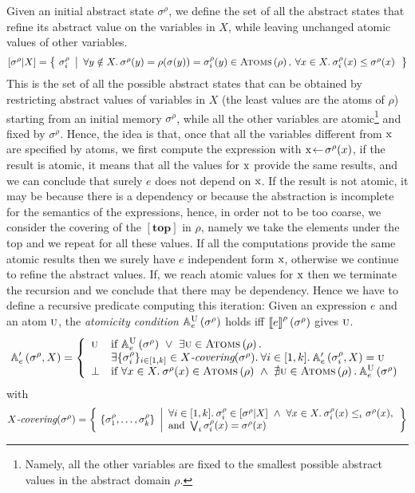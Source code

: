 \documentclass[prodmode,acmtocl]{acmsmall}
\def\state{\ensuremath{\sigma}\xspace}
\newcommand{\BIND}[2]{#1\!\leftarrow\!#2}
\def\uco{\ensuremath{\rho}\xspace}
\def\avaluee{\ensuremath{\mbox{{\sc{u}}}}\xspace}
\def\astate{{\sigma^\rho}\xspace}
\newcommand{\astatei}[1]{{\sigma^\rho_{#1}}\xspace}
\def\ok#1{\mbox{\raisebox{0ex}[1ex][1ex]{$#1$}}}
\newcommand{\sset}[2]{\left\{~#1 ~ \left |
                               \begin{array}{l}#2\end{array}
                          \right.     \right\}}
\newcommand{\0}{\mbox{\bf 0}}
\def\ok#1{\mbox{\raisebox{0ex}[1ex][1ex]{$#1$}}}
\newcommand{\UNARYFUNCTION}[2]{#1\ifthenelse{\equal{#2}{}}{}{\left(#2\right)}}
\newcommand{\BINARYFUNCTION}[3]{#1\ifthenelse{\not\equal{#2}{}}{\left(#2\ifthenelse{\equal{#3}{}}{}{,#3}\right)}{}}
\newcommand{\CODE}[1]{\ensuremath{\mbox{\lstinline!#1!}\xspace}\xspace}
\def\xx{\CODE{x}}
\newcommand{\SEMANTICS}[1]{\left\llbracket #1 \right\rrbracket}
\def\exp{e}
\def\TOP{\ABSVAL{top}}
\newcommand{\ABSVAL}[1]{\left[\mathbf{#1}\right]}
\newcommand{\ABSEVAL}[2]{\ok{\UNARYFUNCTION{\SEMANTICS{#1}^\rho}{#2}}}
\newcommand{\ACC}[2]{\BINARYFUNCTION{\mathbb{A}'_e}{#1}{#2}}
\newcommand{\ACu}[2]{\UNARYFUNCTION{\mathbb{A}^{#1}_e}{#2}}
\newcommand{\SUBS}[2]{\left[#1|#2\right]}
\newcommand{\ATOMS}[1]{\UNARYFUNCTION{\textsc{Atoms}}{#1}}
\begin{document}
Given an initial abstract state $\astate$, we define the set of all
the abstract states that refine its abstract value on the variables in
$X$, while leaving unchanged atomic values of other variables.
\[
\SUBS{\astate}{X}=\sset{\astatei{i}}{\forall y\notin X.\:\astate(y)=\uco(\state(y))=\astatei{i}(y)\in\ATOMS{\uco},\:\forall x\in X.\: \astatei{i}(x)\leq\astate(x)}
\]
This is the set of all the possible abstract states that can be
obtained by restricting abstract values of variables in $X$ (the least
values are the atoms of $\uco$) starting from an initial memory
$\astate$, while all the other variables are atomic\footnote{Namely,
  all the other variables are fixed to the smallest possible abstract
  values in the abstract domain $\uco$.} and fixed by $\astate$.
Hence, the idea is that, once that all the variables different from
\xx are specified by atoms, we first compute the expression with
$\BIND{\xx}{\astate(x)}$, if the result is atomic, it means that all
the values for \xx provide the same results, and we can conclude that
surely $\exp$ does not depend on \xx. If the result is not atomic, it
may be because there is a dependency or because the abstraction is
incomplete for the semantics of the expressions, hence, in order not
to be too coarse, we consider the covering of the $\TOP$ in $\uco$,
namely we take the elements under the top and we repeat for all these
values. If all the computations provide the same atomic results then
we surely have $\exp$ independent form \xx, otherwise we continue to
refine the abstract values. If, we reach atomic values for \xx then we
terminate the recursion and we conclude that there may be
dependency. Hence we have to define a recursive predicate computing
this iteration: Given an expression $\exp$ and an atom $\avaluee$, the
\emph{atomicity condition} $\ACu{\avaluee}{\astate}$ holds iff
$\ABSEVAL{\exp}{\astate}$ gives $\avaluee$.
\[
\ACC{\astate}{X}=
\left \{
\begin{array}{ll}
\avaluee & \mbox{if}\ \ACu{\avaluee}{\astate}\ \vee\ \exists\avaluee\in\ATOMS{\rho}.\:\\
& \exists\{\astatei{i}\}_{i\in[1,k]}\in X\mbox{\em -covering}(\astate).\:\forall i\in[1,k].\:\ACC{\astatei{i}}{X}=\avaluee\\
\bot & \mbox{if}\ \forall x\in X.\:\astate(x)\in\ATOMS{\rho}\ \wedge\ \nexists\avaluee\in\ATOMS{\rho}.\:\ACu{\avaluee}{\astate}\\
\end{array}
\right .
\]
with
\[
X\mbox{\em -covering}(\astate)=\sset{\{\astatei{1},\ldots,\astatei{k}\}}{\forall i\in[1,k].\:\astatei{i}\in \SUBS{\astate}{X}\ \wedge\ \forall x\in X.\:\astatei{i}(x)\leq_\iota\astate(x),\\
\mbox{and}\ \bigvee_i \astatei{i}(x)=\astate(x)}
\]
\end{document}
